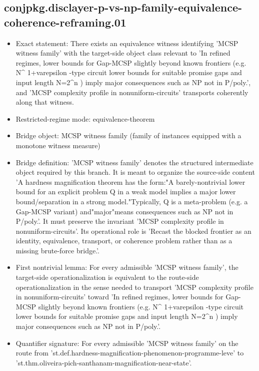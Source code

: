 \documentclass[11pt]{article}
\begin{document}
\subsection*{conjpkg.disclayer-p-vs-np-family-equivalence-coherence-reframing.01}
\begin{itemize}
\item Exact statement: There exists an equivalence witness identifying 'MCSP witness family' with the target-side object class relevant to 'In refined regimes, lower bounds for Gap-MCSP slightly beyond known frontiers (e.g. N\textasciicircum{} 1+varepsilon -type circuit lower bounds for suitable promise gaps and input length N=2\textasciicircum{}n ) imply major consequences such as NP not in P/poly.', and 'MCSP complexity profile in nonuniform-circuits' transports coherently along that witness.
\item Restricted-regime mode: equivalence-theorem
\item Bridge object: MCSP witness family (family of instances equipped with a monotone witness measure)
\item Bridge definition: 'MCSP witness family' denotes the structured intermediate object required by this branch. It is meant to organize the source-side content 'A hardness magnification theorem has the form:"A barely-nontrivial lower bound for an explicit problem Q in a weak model implies a major lower bound/separation in a strong model."Typically, Q is a meta-problem (e.g. a Gap-MCSP variant) and"major"means consequences such as NP not in P/poly.'. It must preserve the invariant 'MCSP complexity profile in nonuniform-circuits'. Its operational role is 'Recast the blocked frontier as an identity, equivalence, transport, or coherence problem rather than as a missing brute-force bridge.'.
\item First nontrivial lemma: For every admissible 'MCSP witness family', the target-side operationalization is equivalent to the route-side operationalization in the sense needed to transport 'MCSP complexity profile in nonuniform-circuits' toward 'In refined regimes, lower bounds for Gap-MCSP slightly beyond known frontiers (e.g. N\textasciicircum{} 1+varepsilon -type circuit lower bounds for suitable promise gaps and input length N=2\textasciicircum{}n ) imply major consequences such as NP not in P/poly.'.
\item Quantifier signature: For every admissible 'MCSP witness family' on the route from 'st.def.hardness-magnification-phenomenon-programme-leve' to 'st.thm.oliveira-pich-santhanam-magnification-near-state'.

\end{itemize}
\end{document}
